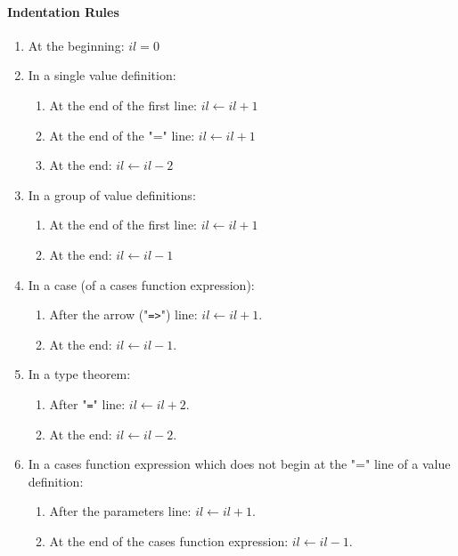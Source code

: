 \documentclass[diploma]{softlab-thesis}
\begin{document}
\paragraph{Indentation Rules}
\begin{enumerate}

\item
At the beginning: $il = 0$

\item
In a single value definition:
  \begin{enumerate}

  \item
  At the end of the first line: $il \leftarrow il + 1$

  \item
  At the end of the "=" line: $il \leftarrow il + 1$

  \item
  At the end: $il \leftarrow il - 2$
  \end{enumerate}

\item
In a group of value definitions:
  \begin{enumerate}

  \item
  At the end of the first line: $il \leftarrow il + 1$

  \item
  At the end: $il \leftarrow il - 1$
  \end{enumerate}

\item
In a case (of a cases function expression):
  \begin{enumerate}

  \item
  After the arrow ("\verb|=>|") line: $il \leftarrow il + 1$.

  \item
  At the end: $il \leftarrow il - 1$.
  \end{enumerate}

\item
In a type theorem:
  \begin{enumerate}

  \item
  After "\verb|=|" line: $il \leftarrow il + 2$.

  \item
  At the end: $il \leftarrow il - 2$.
  \end{enumerate}

\item
In a cases function expression which does not begin at the "=" line of a value
definition:
  \begin{enumerate}

  \item
  After the parameters line: $il \leftarrow il + 1$.

  \item
  At the end of the cases function expression: $il \leftarrow il - 1$.

  \end{enumerate}

\end{enumerate}
\end{document}
